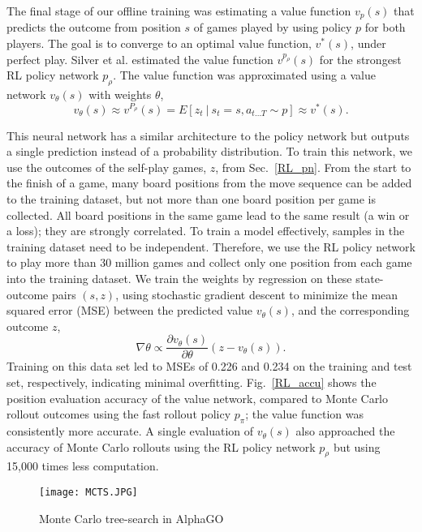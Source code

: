 The final stage of our offline training was estimating a value function $v_p(s)$ that predicts the outcome from position $s$ of games played by using policy $p$ for both players. The goal is to converge to an optimal value function, $v^*(s)$, under perfect play. Silver et al.\cite{b12} estimated the value function $v^{p_\rho}(s)$ for the strongest RL policy network $p_\rho$. The value function was approximated using a value network $v_\theta(s)$ with weights $\theta$, 
\begin{equation}
   v_\theta(s) \approx v^{P_\rho}(s) = E[z_t\ |\ s_t = s, a_{t...T} \sim p] \approx v^*(s).
\end{equation}

This neural network has a similar architecture to the policy network but outputs a single prediction instead of a probability distribution. To train this network, we use the outcomes of the self-play games, $z$, from Sec.~\ref{RL_pn}. From the start to the finish of a game, many board positions from the move sequence can be added to the training dataset, but not more than one board position per game is collected. All board positions in the same game lead to the same result (a win or a loss); they are strongly correlated. To train a model effectively, samples in the training dataset need to be independent. Therefore, we use the RL policy network to play more than 30 million games and collect only one position from each game into the training dataset. We train the weights by regression on these state-outcome pairs $(s, z)$, using stochastic gradient descent to minimize the mean squared error (MSE) between the predicted value $v_\theta(s)$, and the corresponding outcome $z$,
\begin{equation}
    \nabla \theta \propto \frac{\partial v_\theta(s)}{\partial \theta} (z - v_\theta(s)).
\end{equation}
Training on this data set led to MSEs of 0.226 and 0.234 on the training and test set, respectively, indicating minimal overfitting. Fig.~\ref{RL_accu} shows the position evaluation accuracy of the value network, compared to Monte Carlo rollout outcomes using the fast rollout policy $p_\pi$; the value function was consistently more accurate. A single evaluation of $v_\theta(s)$ also approached the accuracy of Monte Carlo rollouts using the RL policy network $p_\rho$ but using 15,000 times less computation.

\begin{figure}[t]
\centerline{\texttt{[image: MCTS.JPG]}}
\caption{Monte Carlo tree-search in AlphaGO\cite{b12}}
\label{MCTS_1}
\end{figure}